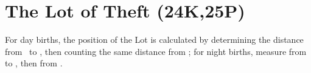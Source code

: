 \section{The Lot of Theft (24K,25P)}
For day births, the position of the Lot is calculated by determining the distance from \Mercury\, to \Mars,
then counting the same distance from \Saturn; for night births, measure from \Mars\, to \Mercury, then from \Saturn.

\newpage